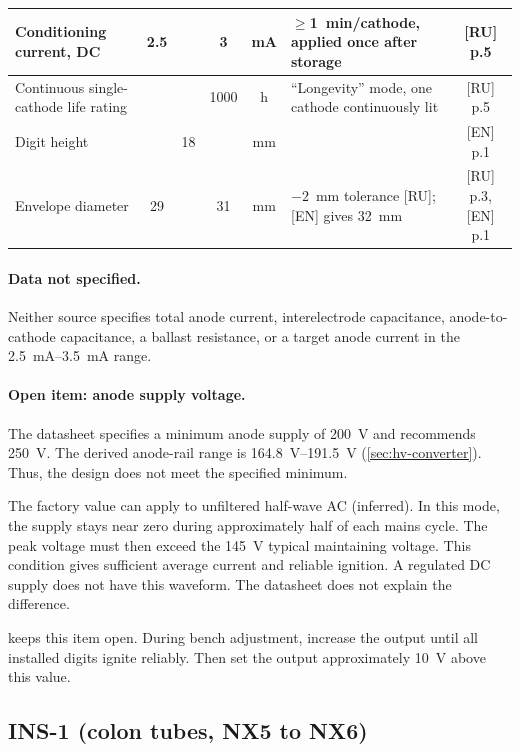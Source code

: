 {\begin{longtable}{|L{3.6cm}|c|c|c|c|L{4.4cm}|c|}
\hline
Conditioning current, DC & \num{2.5} & & \num{3} & \si{\milli\ampere} & $\geq$\SI{1}{\minute}/cathode, applied once after storage & [RU] p.5 \\
\hline
Continuous single-cathode life rating & & & \num{1000} & h & ``Longevity'' mode, one cathode continuously lit & [RU] p.5 \\
\hline
Digit height & & \num{18} & & mm & & [EN] p.1 \\
\hline
Envelope diameter & \num{29} & & \num{31} & mm & $-2$~mm tolerance [RU]; [EN] gives \SI{32}{\milli\meter} & [RU] p.3, [EN] p.1 \\
\hline
\end{longtable}
}

\paragraph{Data not specified.} Neither source specifies total anode current,
interelectrode capacitance, anode-to-cathode capacitance, a ballast resistance,
or a target anode current in the \SIrange{2.5}{3.5}{\milli\ampere} range.

\paragraph{Open item: anode supply voltage.} The datasheet specifies a minimum
anode supply of \SI{200}{\volt} and recommends \SI{250}{\volt}. The derived
anode-rail range is \SIrange{164.8}{191.5}{\volt}
(\cref{sec:hv-converter}). Thus, the design does not meet the specified minimum.

The factory value can apply to unfiltered half-wave AC (inferred). In this
mode, the supply stays near zero during approximately half of each mains cycle.
The peak voltage must then exceed the \SI{145}{\volt} typical maintaining
voltage. This condition gives sufficient average current and reliable ignition.
A regulated DC supply does not have this waveform. The datasheet does not
explain the difference.

 keeps this item open. During bench adjustment, increase
the output until all installed digits ignite reliably. Then set the output
approximately \SI{10}{\volt} above this value.

\subsection{INS-1 (colon tubes, NX5 to NX6)}
\label{sec:ins1}

